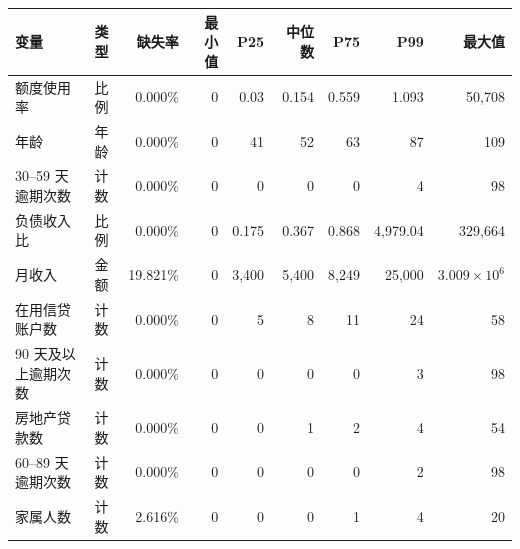\begin{tabular}{llrrrrrrr}
\toprule
变量 & 类型 & 缺失率 & 最小值 & P25 & 中位数 & P75 & P99 & 最大值 \\
\midrule
额度使用率 & 比例 & 0.000\% & 0 & 0.03 & 0.154 & 0.559 & 1.093 & 50,708 \\
年龄 & 年龄 & 0.000\% & 0 & 41 & 52 & 63 & 87 & 109 \\
30--59 天逾期次数 & 计数 & 0.000\% & 0 & 0 & 0 & 0 & 4 & 98 \\
负债收入比 & 比例 & 0.000\% & 0 & 0.175 & 0.367 & 0.868 & 4,979.04 & 329,664 \\
月收入 & 金额 & 19.821\% & 0 & 3,400 & 5,400 & 8,249 & 25,000 & $3.009\times10^{6}$ \\
在用信贷账户数 & 计数 & 0.000\% & 0 & 5 & 8 & 11 & 24 & 58 \\
90 天及以上逾期次数 & 计数 & 0.000\% & 0 & 0 & 0 & 0 & 3 & 98 \\
房地产贷款数 & 计数 & 0.000\% & 0 & 0 & 1 & 2 & 4 & 54 \\
60--89 天逾期次数 & 计数 & 0.000\% & 0 & 0 & 0 & 0 & 2 & 98 \\
家属人数 & 计数 & 2.616\% & 0 & 0 & 0 & 1 & 4 & 20 \\
\bottomrule
\end{tabular}
